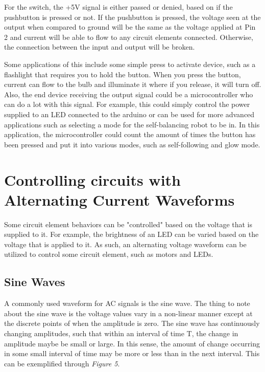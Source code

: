 \documentclass[12pt]{article}
\begin{document}
For the switch, the +5V signal is either passed or denied, based on if the pushbutton is pressed or not. If the pushbutton is pressed, the voltage seen at the output when compared to ground will be the same as the voltage applied at Pin 2 and current will be able to flow to any circuit elements connected. Otherwise, the connection between the input and output will be broken.

Some applications of this include some simple press to activate device, such as a flashlight that requires you to hold the button. When you press the button, current can flow to the bulb and illuminate it where if you release, it will turn off. Also, the end device receiving the output signal could be a microcontroller who can do a lot with this signal. For example, this could simply control the power supplied to an LED connected to the arduino or can be used for more advanced applications such as selecting a mode for the self-balancing robot to be in. In this application, the microcontroller could count the amount of times the button has been pressed and put it into various modes, such as self-following and glow mode.

\section{Controlling circuits with Alternating Current Waveforms}

Some circuit element behaviors can be "controlled" based on the voltage that is supplied to it. For example, the brightness of an LED can be varied based on the voltage that is applied to it. As such, an alternating voltage waveform can be utilized to control some circuit element, such as motors and LEDs.

\subsection{Sine Waves}

A commonly used waveform for AC signals is the sine wave. The thing to note about the sine wave is the voltage values vary in a non-linear manner except at the discrete points of when the amplitude is zero. The sine wave has continuously changing amplitudes, such that within an interval of time T, the change in amplitude maybe be small or large. In this sense, the amount of change occurring in some small interval of time may be more or less than in the next interval. This can be exemplified through \textit{Figure 5}.
\end{document}
